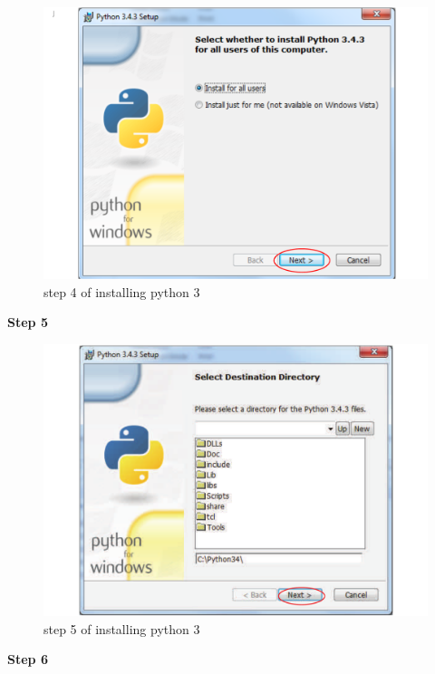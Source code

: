 \begin{figure}[H]
    \includegraphics[width=\textwidth]{./Manual/images/python4.pdf}
    \caption{step 4 of installing python 3} \label{fig:installing python3 4}
\end{figure}

\textbf{Step 5}

\begin{figure}[H]
    \includegraphics[width=\textwidth]{./Manual/images/python5.pdf}
    \caption{step 5 of installing python 3} \label{fig:installing python3 5}
\end{figure}

\textbf{Step 6}

